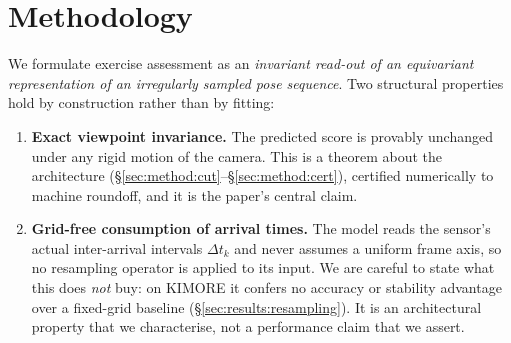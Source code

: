 %
%
%

\section{Methodology}
\label{sec:method}

We formulate exercise assessment as an \emph{invariant read-out of an equivariant representation of
an irregularly sampled pose sequence}. Two structural properties hold by construction rather than by
fitting:

\begin{enumerate}
\item[(i)] \textbf{Exact viewpoint invariance.} The predicted score is provably unchanged under any
rigid motion of the camera. This is a theorem about the architecture
(\S\ref{sec:method:cut}--\S\ref{sec:method:cert}), certified numerically to machine roundoff, and it
is the paper's central claim.
\item[(ii)] \textbf{Grid-free consumption of arrival times.} The model reads the sensor's actual
inter-arrival intervals $\Delta t_k$ and never assumes a uniform frame axis, so no resampling
operator is applied to its input. We are careful to state what this does \emph{not} buy: on KIMORE it
confers no accuracy or stability advantage over a fixed-grid baseline
(\S\ref{sec:results:resampling}). It is an architectural property that we characterise, not a
performance claim that we assert.
\end{enumerate}

